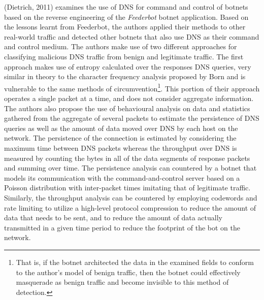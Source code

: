 \documentclass[12pt]{report}
\theoremstyle{remark}
\theoremstyle{definition}
\theoremstyle{definition}
\theoremstyle{definition}
\begin{document}
(Dietrich, 2011)\cite{Dietrich2011} examines the use of DNS for command and
control of botnets based on the reverse engineering of the \emph{Feederbot}
botnet application. Based on the lessons learnt from Feederbot, the authors
applied their methods to other real-world traffic and detected other botnets
that also use DNS as their command and control medium. The authors make use of
two different approaches for classifying malicious DNS traffic from benign and
legitimate traffic. The first approach makes use of entropy calculated over the
responses DNS queries, very similar in theory to the character frequency
analysis proposed by Born\cite{Born2010.cfa} and is vulnerable to the same
methods of circumvention\footnote{That is, if the botnet architected the data in
the examined fields to conform to the author's model of benign traffic, then the
botnet could effectively masquerade as benign traffic and become invisible to
this method of detection.}. This portion of their approach operates a single
packet at a time, and does not consider aggregate information. The authors also
propose the use of behavioural analysis on data and statistics gathered from the
aggregate of several packets to estimate the persistence of DNS queries as well
as the amount of data moved over DNS by each host on the network. The
persistence of the connection is estimated by considering the maximum time
between DNS packets whereas the throughput over DNS is measured by counting the
bytes in all of the data segments of response packets and summing over time. The
persistence analysis can countered by a botnet that models its communication
with the command-and-control server based on a Poisson distribution with
inter-packet times imitating that of legitimate traffic. Similarly, the
throughput analysis can be countered by employing codewords and rate limiting to
utilize a high-level protocol compression to reduce the amount of data that
needs to be sent, and to reduce the amount of data actually transmitted in a
given time period to reduce the footprint of the bot on the network.
\end{document}
